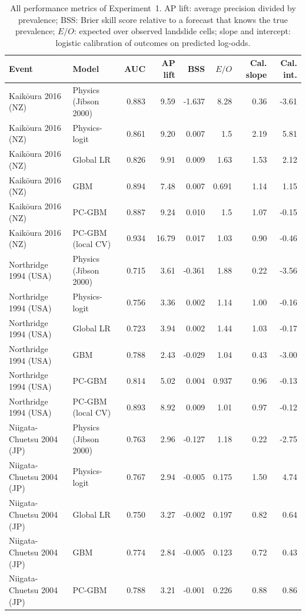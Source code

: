 \begin{longtable}{llrrrrrr}
\caption{All performance metrics of Experiment~1. AP lift: average precision divided by prevalence; BSS: Brier skill score relative to a forecast that knows the true prevalence; $E/O$: expected over observed landslide cells; slope and intercept: logistic calibration of outcomes on predicted log-odds.}\label{tab:full}\\
\toprule Event & Model & AUC & AP lift & BSS & $E/O$ & Cal. slope & Cal. int.\\\midrule\endhead
Kaik\={o}ura 2016 (NZ) & Physics (Jibson 2000) & 0.883 & 9.59 & -1.637 & 8.28 & 0.36 & -3.61\\
Kaik\={o}ura 2016 (NZ) & Physics-logit & 0.861 & 9.20 & 0.007 & 1.5 & 2.19 & 5.81\\
Kaik\={o}ura 2016 (NZ) & Global LR & 0.826 & 9.91 & 0.009 & 1.63 & 1.53 & 2.12\\
Kaik\={o}ura 2016 (NZ) & GBM & 0.894 & 7.48 & 0.007 & 0.691 & 1.14 & 1.15\\
Kaik\={o}ura 2016 (NZ) & PC-GBM & 0.887 & 9.24 & 0.010 & 1.5 & 1.07 & -0.15\\
Kaik\={o}ura 2016 (NZ) & PC-GBM (local CV) & 0.934 & 16.79 & 0.017 & 1.03 & 0.90 & -0.46\\
\midrule
Northridge 1994 (USA) & Physics (Jibson 2000) & 0.715 & 3.61 & -0.361 & 1.88 & 0.22 & -3.56\\
Northridge 1994 (USA) & Physics-logit & 0.756 & 3.36 & 0.002 & 1.14 & 1.00 & -0.16\\
Northridge 1994 (USA) & Global LR & 0.723 & 3.94 & 0.002 & 1.44 & 1.03 & -0.17\\
Northridge 1994 (USA) & GBM & 0.788 & 2.43 & -0.029 & 1.04 & 0.43 & -3.00\\
Northridge 1994 (USA) & PC-GBM & 0.814 & 5.02 & 0.004 & 0.937 & 0.96 & -0.13\\
Northridge 1994 (USA) & PC-GBM (local CV) & 0.893 & 8.92 & 0.009 & 1.01 & 0.97 & -0.12\\
\midrule
Niigata-Chuetsu 2004 (JP) & Physics (Jibson 2000) & 0.763 & 2.96 & -0.127 & 1.18 & 0.22 & -2.75\\
Niigata-Chuetsu 2004 (JP) & Physics-logit & 0.767 & 2.94 & -0.005 & 0.175 & 1.50 & 4.74\\
Niigata-Chuetsu 2004 (JP) & Global LR & 0.750 & 3.27 & -0.002 & 0.197 & 0.82 & 0.64\\
Niigata-Chuetsu 2004 (JP) & GBM & 0.774 & 2.84 & -0.005 & 0.123 & 0.72 & 0.43\\
Niigata-Chuetsu 2004 (JP) & PC-GBM & 0.788 & 3.21 & -0.001 & 0.226 & 0.88 & 0.86\\

\end{longtable}
